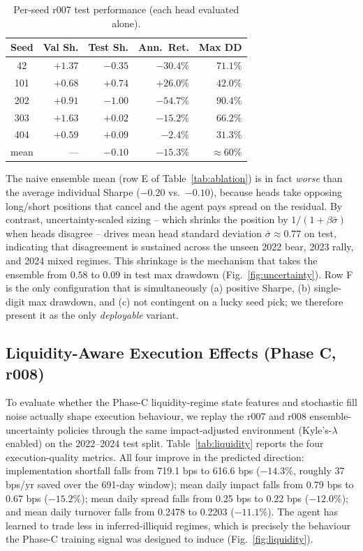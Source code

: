 \documentclass[conference]{IEEEtran}
\begin{document}
\begin{table}[t]
  \centering
  \footnotesize
  \caption{Per-seed r007 test performance (each head evaluated alone).}
  \label{tab:perseed}
  \begin{tabular}{crrrr}
    \toprule
    Seed & Val Sh. & Test Sh. & Ann.\ Ret. & Max DD \\
    \midrule
    42  & $+1.37$ & $-0.35$          & $-30.4\%$          & $71.1\%$ \\
    101 & $+0.68$ & $\mathbf{+0.74}$ & $\mathbf{+26.0\%}$ & $42.0\%$ \\
    202 & $+0.91$ & $-1.00$          & $-54.7\%$          & $90.4\%$ \\
    303 & $+1.63$ & $+0.02$          & $-15.2\%$          & $66.2\%$ \\
    404 & $+0.59$ & $+0.09$          & $-2.4\%$           & $31.3\%$ \\
    \midrule
    mean & --- & $-0.10$ & $-15.3\%$ & ${\approx}60\%$ \\
    \bottomrule
  \end{tabular}
\end{table}

The naive ensemble mean (row E of Table~\ref{tab:ablation}) is in fact
\emph{worse} than the average individual Sharpe ($-0.20$ vs.\ $-0.10$),
because heads take opposing long/short positions that cancel and the
agent pays spread on the residual. By contrast, uncertainty-scaled
sizing -- which shrinks the position by $1/(1+\beta\bar\sigma)$ when
heads disagree -- drives mean head standard deviation $\bar\sigma
\approx 0.77$ on test, indicating that disagreement is sustained across
the unseen 2022 bear, 2023 rally, and 2024 mixed regimes. This
shrinkage is the mechanism that takes the ensemble from $0.58$ to
$0.09$ in test max drawdown (Fig.~\ref{fig:uncertainty}). Row F is the
only configuration that is simultaneously (a) positive Sharpe, (b)
single-digit max drawdown, and (c) not contingent on a lucky seed pick;
we therefore present it as the only \emph{deployable} variant.

\subsection{Liquidity-Aware Execution Effects (Phase C, r008)}
\label{sec:results-liquidity}

To evaluate whether the Phase-C liquidity-regime state features and
stochastic fill noise actually shape execution behaviour, we replay the
r007 and r008 ensemble-uncertainty policies through the same
impact-adjusted environment (Kyle's-$\lambda$ enabled) on the
2022--2024 test split. Table~\ref{tab:liquidity} reports the four
execution-quality metrics. All four improve in the predicted direction:
implementation shortfall falls from 719.1 bps to 616.6 bps
($-14.3\%$, roughly 37 bps/yr saved over the 691-day window); mean
daily impact falls from 0.79 bps to 0.67 bps ($-15.2\%$); mean daily
spread falls from 0.25 bps to 0.22 bps ($-12.0\%$); and mean daily
turnover falls from 0.2478 to 0.2203 ($-11.1\%$). The agent has
learned to trade less in inferred-illiquid regimes, which is precisely
the behaviour the Phase-C training signal was designed to induce
(Fig.~\ref{fig:liquidity}).
\end{document}
